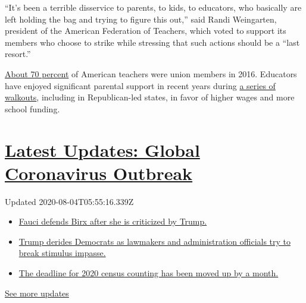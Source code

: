 ``It's been a terrible disservice to parents, to kids, to educators, who
basically are left holding the bag and trying to figure this out,'' said
Randi Weingarten, president of the American Federation of Teachers,
which voted to support its members who choose to strike while stressing
that such actions should be a ``last resort.''

\href{https://nces.ed.gov/surveys/ntps/tables/Table_TeachersUnion.asp}{About
70 percent} of American teachers were union members in 2016. Educators
have enjoyed significant parental support in recent years during
\href{https://www.nytimes.com/2019/01/14/us/lausd-teachers-strike.html}{a
series of walkouts}, including in Republican-led states, in favor of
higher wages and more school funding.

\hypertarget{latest-updates-global-coronavirus-outbreak}{%
\section{\texorpdfstring{\href{https://www.nytimes.com/2020/08/03/world/coronavirus-covid-19.html?action=click\&pgtype=Article\&state=default\&region=MAIN_CONTENT_1\&context=storylines_live_updates}{Latest
Updates: Global Coronavirus
Outbreak}}{Latest Updates: Global Coronavirus Outbreak}}\label{latest-updates-global-coronavirus-outbreak}}

Updated 2020-08-04T05:55:16.339Z

\begin{itemize}
\tightlist
\item
  \href{https://www.nytimes.com/2020/08/03/world/coronavirus-covid-19.html?action=click\&pgtype=Article\&state=default\&region=MAIN_CONTENT_1\&context=storylines_live_updates\#link-4547638f}{Fauci
  defends Birx after she is criticized by Trump.}
\item
  \href{https://www.nytimes.com/2020/08/03/world/coronavirus-covid-19.html?action=click\&pgtype=Article\&state=default\&region=MAIN_CONTENT_1\&context=storylines_live_updates\#link-15e7f995}{Trump
  derides Democrats as lawmakers and administration officials try to
  break stimulus impasse.}
\item
  \href{https://www.nytimes.com/2020/08/03/world/coronavirus-covid-19.html?action=click\&pgtype=Article\&state=default\&region=MAIN_CONTENT_1\&context=storylines_live_updates\#link-e5a2cda}{The
  deadline for 2020 census counting has been moved up by a month.}
\end{itemize}

\href{https://www.nytimes.com/2020/08/03/world/coronavirus-covid-19.html?action=click\&pgtype=Article\&state=default\&region=MAIN_CONTENT_1\&context=storylines_live_updates}{See
more updates}

